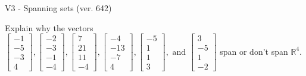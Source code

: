 \begin{exercise}
  \begin{exerciseTitle}V3 - Spanning sets (ver. 642)\end{exerciseTitle}
  \begin{exerciseStatement}
    Explain why the vectors \(\left[\begin{array}{r}
-1 \\
-5 \\
-3 \\
4
\end{array}\right] , \left[\begin{array}{r}
-2 \\
-3 \\
-1 \\
-4
\end{array}\right] , \left[\begin{array}{r}
7 \\
21 \\
11 \\
-4
\end{array}\right] , \left[\begin{array}{r}
-4 \\
-13 \\
-7 \\
4
\end{array}\right] , \left[\begin{array}{r}
-5 \\
1 \\
1 \\
3
\end{array}\right] , \text{ and } \left[\begin{array}{r}
3 \\
-5 \\
1 \\
-2
\end{array}\right]\) span or don't span \(\mathbb{R}^4\). 
	



\end{exerciseStatement}
\end{exercise}

